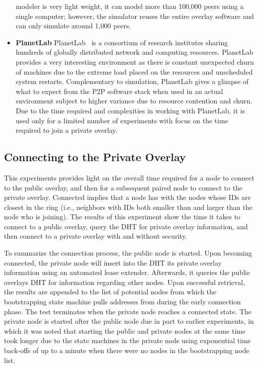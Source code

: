 \begin{itemize}
modeler is very light weight, it can model more than 100,000 peers using a
single computer; however, the simulator reuses the entire overlay software and
can only simulate around 1,000 peers.
\item \textbf{PlanetLab} PlanetLab~\cite{planetlab} is a consortium of research
institutes sharing hundreds of globally distributed network and computing
resources.  PlanetLab provides a very interesting environment as there is
constant unexpected churn of machines due to the extreme load placed on the
resources and unscheduled system restarts.  Complementary to simulation,
PlanetLab gives a glimpse of what to expect from the P2P software stack when
used in an actual environment subject to higher variance due to resource
contention and churn.  Due to the time required and complexities in working with
PlanetLab, it is used only for a limited number of experiments with focus on the
time required to join a private overlay.
\end{itemize}

\subsection{Connecting to the Private Overlay}
This experiments provides light on the overall time required for a node to
connect to the public overlay, and then for a subsequent paired node to connect
to the private overlay.  Connected implies that a node has with the nodes whose
IDs are closest in the ring (i.e., neighbors with IDs both smaller than and
larger than the node who is joining).  The results of this experiment show the
time it takes to connect to a public overlay, query the DHT for private overlay
information, and then connect to a private overlay with and without security.

To summarize the connection process, the public node is started.  Upon becoming
connected, the private node will insert into the DHT its private overlay
information using an automated lease extender.  Afterwards, it queries the
public overlays DHT for information regarding other nodes.  Upon successful
retrieval, the results are appended to the list of potential nodes from which
the bootstrapping state machine pulls addresses from during the early
connection phase.  The test terminates when the private node reaches a
connected state.  The private node is started after the public node due in part
to earlier experiments, in which it was noted that starting the public and
private nodes at the same time took longer due to the state machines in the
private node using exponential time back-offs of up to a minute when there
were no nodes in the bootstrapping node list.

